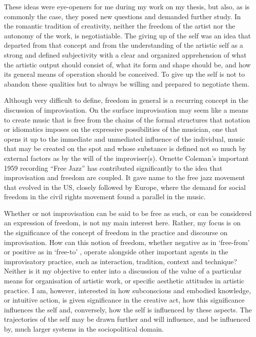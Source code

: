 \documentclass[a4paper]{article}
\begin{document}
These ideas were eye-openers for me during my work on my thesis, but also, as is commonly the case, they posed new questions and demanded further study. In the romantic tradition of creativity, neither the freedom of the artist nor the autonomy of the work, is negotiatiable. The giving up of the self was an idea that departed from that concept and from the understanding of the artistic self as a strong and defined subjectivity with a clear and organized apprehension of what the artistic output should consist of, what its form and shape should be, and how its general means of operation should be conceived. To give up the self is not to abandon these qualities but to always be willing and prepared to negotiate them. 

Although very difficult to define, freedom in general is a recurring concept in the discussion of improvisation. On the surface improvisation may seem like a means to create music that is free from the chains of the formal structures that notation or idiomatics imposes on the expressive possibilities of the musician, one that opens it up to the immediate and unmediated influence of the individual, music that may be created on the spot and whose substance is defined not so much by external factors as by the will of the improviser(s). Ornette Coleman's important 1959 recording ``Free Jazz'' has contributed significantly to the idea that improvisation and freedom are coupled. It gave name to the free jazz movement that evolved in the US, closely followed by Europe, where the demand for social freedom in the civil rights movement found a parallel in the music.

Whether or not improvisation can be said to be free as such, or can be considered an expression of freedom, is not my main interest here. Rather, my focus is on the significance of the concept of freedom in the practice and discourse on improvisation. How can this notion of freedom, whether negative as in `free-from' or positive as in `free-to' \citep{peters09}, operate alongside other important agents in the improvisatory practice, such as interaction, tradition, context and technique? Neither is it my objective to enter into a discussion of the value of a particular means for organisation of artistic work, or specific aesthetic attitudes in artistic practice. I am, however, interested in how subconscious and embodied knowledge, or intuitive action, is given significance in the creative act, how this significance influences the self and, conversely, how the self is influenced by these aspects. The trajectories of the self may be drawn further and will influence, and be influenced by, much larger systems in the sociopolitical domain.
\end{document}
